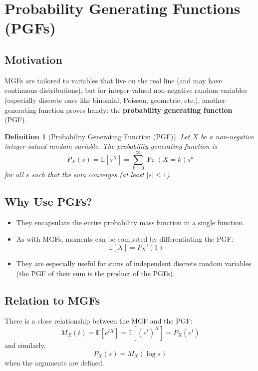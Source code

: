 \documentclass[12pt]{article}
\newtheorem{definition}[theorem]{Definition}
\newcommand{\E}{\mathbb{E}}
\begin{document}
\section{Probability Generating Functions (PGFs)}

\subsection{Motivation}
MGFs are tailored to variables that live on the real line (and may have continuous distributions), but for integer-valued non-negative random variables (especially discrete ones like binomial, Poisson, geometric, etc.), another generating function proves handy: the \textbf{probability generating function} (PGF).

\begin{definition}[Probability Generating Function (PGF)]
    Let $X$ be a non-negative integer-valued random variable. The probability generating function is
    \[
     P_X(s) = \mathbb{E}[s^X] = \sum_{k=0}^{\infty} \Pr(X = k) s^k
    \]
    for all $s$ such that the sum converges (at least $|s| \leq 1$).
\end{definition}

\subsection{Why Use PGFs?}
\begin{itemize}
    \item They encapsulate the entire probability mass function in a single function.
    \item As with MGFs, moments can be computed by differentiating the PGF:
    \[
     \E[X] = P_X'(1)
    \]
    \item They are especially useful for sums of independent discrete random variables (the PGF of their sum is the product of the PGFs).
\end{itemize}

\subsection{Relation to MGFs}
There is a close relationship between the MGF and the PGF:
\[
    M_X(t) = \E[e^{tX}] = \E[(e^{t})^X] = P_X(e^{t})
\]
and similarly,
\[
    P_X(s) = M_X(\log s)
\]
when the arguments are defined.

\end{document}
